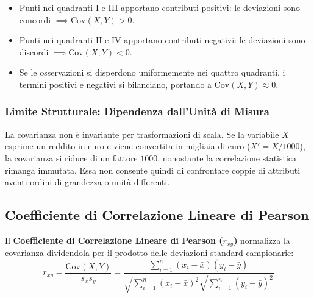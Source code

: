 \begin{itemize}
    \item Punti nei quadranti I e III apportano contributi positivi: le deviazioni sono concordi $\implies \text{Cov}(X, Y) > 0$.
    \item Punti nei quadranti II e IV apportano contributi negativi: le deviazioni sono discordi $\implies \text{Cov}(X, Y) < 0$.
    \item Se le osservazioni si disperdono uniformemente nei quattro quadranti, i termini positivi e negativi si bilanciano, portando a $\text{Cov}(X, Y) \approx 0$.
\end{itemize}

\subsubsection{Limite Strutturale: Dipendenza dall'Unità di Misura}
La covarianza non è invariante per trasformazioni di scala. Se la variabile $X$ esprime un reddito in euro e viene convertita in migliaia di euro ($X' = X / 1000$), la covarianza si riduce di un fattore $1000$, nonostante la correlazione statistica rimanga immutata. Essa non consente quindi di confrontare coppie di attributi aventi ordini di grandezza o unità differenti.

\subsection{Coefficiente di Correlazione Lineare di Pearson}

Il \textbf{Coefficiente di Correlazione Lineare di Pearson ($r_{xy}$)} normalizza la covarianza dividendola per il prodotto delle deviazioni standard campionarie:
\begin{equation}
    r_{xy} = \frac{\text{Cov}(X, Y)}{s_x s_y} = \frac{\sum_{i=1}^n (x_i - \bar{x})(y_i - \bar{y})}{\sqrt{\sum_{i=1}^n (x_i - \bar{x})^2} \sqrt{\sum_{i=1}^n (y_i - \bar{y})^2}}
\end{equation}

